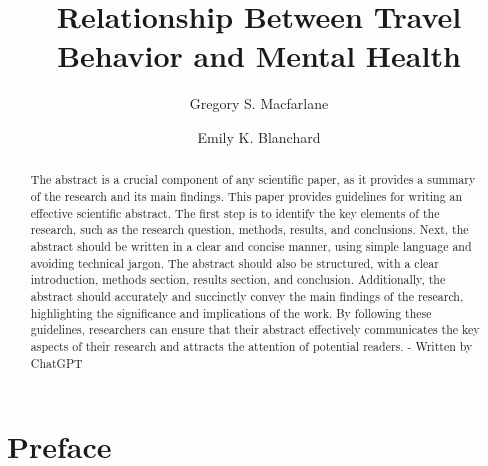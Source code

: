 \documentclass[
  letterpaper,
  authoryear]{elsarticle}
\begin{document}
\begin{frontmatter}
\title{Relationship Between Travel Behavior and Mental Health}
\author[1]{Gregory S. Macfarlane%
%
}
\author[1]{Emily K. Blanchard%
%
}




        
\begin{abstract}
The abstract is a crucial component of any scientific paper, as it
provides a summary of the research and its main findings. This paper
provides guidelines for writing an effective scientific abstract. The
first step is to identify the key elements of the research, such as the
research question, methods, results, and conclusions. Next, the abstract
should be written in a clear and concise manner, using simple language
and avoiding technical jargon. The abstract should also be structured,
with a clear introduction, methods section, results section, and
conclusion. Additionally, the abstract should accurately and succinctly
convey the main findings of the research, highlighting the significance
and implications of the work. By following these guidelines, researchers
can ensure that their abstract effectively communicates the key aspects
of their research and attracts the attention of potential readers. -
Written by ChatGPT
\end{abstract}





\end{frontmatter}
    \ifdefined\Shaded\renewenvironment{Shaded}{\begin{tcolorbox}[borderline west={3pt}{0pt}{shadecolor}, interior hidden, breakable, frame hidden, sharp corners, enhanced, boxrule=0pt]}{\end{tcolorbox}}\fi


\hypertarget{preface}{%
\section*{Preface}\label{preface}}

\end{document}
